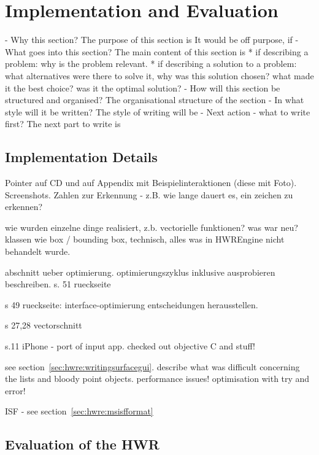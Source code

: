 
\chapter{Implementation and Evaluation}

- Why this section? 
  The purpose of this section is 
  It would be off purpose, if 
- What goes into this section?
  The main content of this section is 
  * if describing a problem: why is the problem relevant.
  * if describing a solution to a problem: what alternatives were
    there to solve it, why was this solution chosen? 
    what made it the best choice? was it the optimal solution?
- How will this section be structured and organised?
  The organisational structure of the section 
- In what style will it be written?
  The style of writing will be 
- Next action - what to write first?
  The next part to write is

\section{Implementation Details}
Pointer auf CD und auf Appendix mit Beispielinteraktionen (diese mit Foto).
Screenshots.
Zahlen zur Erkennung - z.B. wie lange dauert es, ein zeichen zu erkennen?

wie wurden einzelne dinge realisiert, z.b. vectorielle funktionen?
was war neu?
klassen wie box / bounding box, technisch, alles was in HWREngine nicht behandelt
wurde.

abschnitt ueber optimierung.
optimierungszyklus inklusive ausprobieren beschreiben.
s. 51 rueckseite

s 49 rueckseite: interface-optimierung
entscheidungen herausstellen. 

s 27,28 vectorschnitt

s.11 iPhone - port of input app. checked out objective C and stuff!

see section~\ref{sec:hwre:writingsurfacegui}. describe what was difficult concerning the lists and bloody point objects.
performance issues! optimisation with try and error!

ISF - see section~\ref{sec:hwre:msisfformat}


\section{Evaluation of the HWR}
